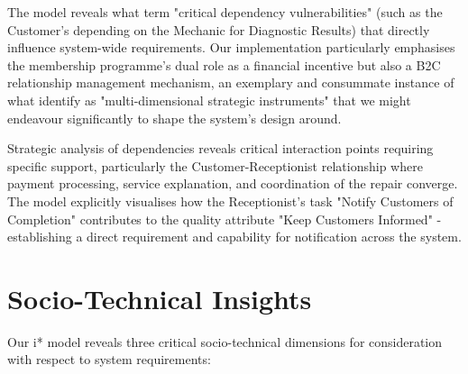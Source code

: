 \documentclass[14pt,a4paper]{article}
\begin{document}
The model reveals what \textit{\parencite[p. 78]{Horkoff2019}} term "critical dependency vulnerabilities" (such as the Customer's depending on the Mechanic for Diagnostic Results) that directly influence system-wide requirements. Our implementation particularly emphasises the membership programme's dual role as a financial incentive but also a B2C relationship management mechanism, an exemplary and consummate instance of what \textit{\parencite[p. 177]{Estrada2020}} identify as "multi-dimensional strategic instruments" that we might endeavour significantly to shape the system's design around.

Strategic analysis of dependencies reveals critical interaction points requiring specific support, particularly the Customer-Receptionist relationship where payment processing, service explanation, and coordination of the repair converge. The model explicitly visualises how the Receptionist's task "Notify Customers of Completion" contributes to the quality attribute "Keep Customers Informed" - establishing a direct requirement and capability for notification across the system.

\section{Socio-Technical Insights}

Our i* model reveals three critical socio-technical dimensions for consideration with respect to system requirements:
\end{document}
